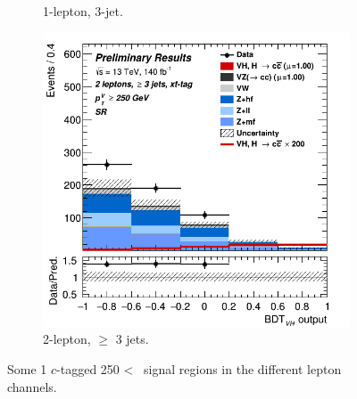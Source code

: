 \begin{figure}[h!]
\begin{subfigure}[b]{0.32\textwidth}
      \caption{1-lepton, 3-jet.}
      \label{fig:plots_VHcc_ex_1L_SR_1C}
  \end{subfigure}
  \begin{subfigure}[b]{0.32\textwidth}
    \centering
    \includegraphics[width=\textwidth]{Images/VH/Own_fit/prefit_VHcc/Region_distmva_BMin250_DSR_J3_TTypext_incJet1_T2_L2_Y6051_Prefit.png}
    \caption{2-lepton, $\geq$ 3 jets.}
    \label{fig:plots_VHcc_ex_2L_SR_1C}
\end{subfigure}
  \caption{Some 1 $c$-tagged 250 < \ptv\ signal regions in the different lepton channels.}
  \label{fig:plots_VHcc_ex_SR_1C}
\end{figure} 

